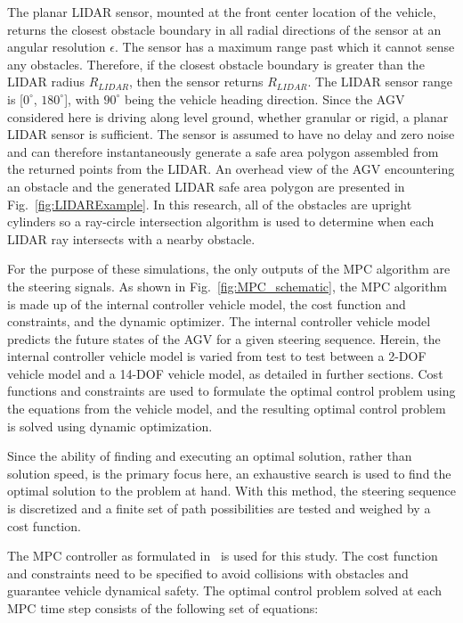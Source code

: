 \documentclass[12pt,onecolumn]{article}
\begin{document}
The planar LIDAR sensor, mounted at the front center location of the vehicle, returns the closest obstacle boundary in all radial directions of the sensor at an angular resolution $\epsilon$. The sensor has a maximum range past which it cannot sense any obstacles. Therefore, if the closest obstacle boundary is greater than the LIDAR radius $R_{LIDAR}$, then the sensor returns $R_{LIDAR}$. The LIDAR sensor range is [$0^\circ$, $180^\circ$], with $90^\circ$ being the vehicle heading direction. Since the AGV considered here is driving along level ground, whether granular or rigid, a planar LIDAR sensor is sufficient. The sensor is assumed to have no delay and zero noise and can therefore instantaneously generate a safe area polygon assembled from the returned points from the LIDAR. An overhead view of the AGV encountering an obstacle and the generated LIDAR safe area polygon are presented in Fig.~\ref{fig:LIDARExample}. 
%
In this research, all of the obstacles are upright cylinders so a ray-circle intersection algorithm is used to determine when each LIDAR ray intersects with a nearby obstacle. 


For the purpose of these simulations, the only outputs of the MPC algorithm are the steering signals. As shown in Fig.~\ref{fig:MPC_schematic}, the MPC algorithm is made up of the internal controller vehicle model, the cost function and constraints, and the dynamic optimizer. The internal controller vehicle model predicts the future states of the AGV for a given steering sequence. Herein, the internal controller vehicle model is varied from test to test between a 2-DOF vehicle model and a 14-DOF vehicle model, as detailed in further sections. Cost functions and constraints are used to formulate the optimal control problem using the equations from the vehicle model, and the resulting optimal control problem is solved using dynamic optimization.

Since the ability of finding and executing an optimal solution, rather than solution speed, is the primary focus here, an exhaustive search is used to find the optimal solution to the problem at hand. With this method, the steering sequence is discretized and a finite set of path possibilities are tested and weighed by a cost function. 

The MPC controller as formulated in~\cite{ModelFidelity2016} is used for this study. The cost function and constraints need to be specified to avoid collisions with obstacles and guarantee vehicle dynamical safety. The optimal control problem solved at each MPC time step consists of the following set of equations:
\end{document}
